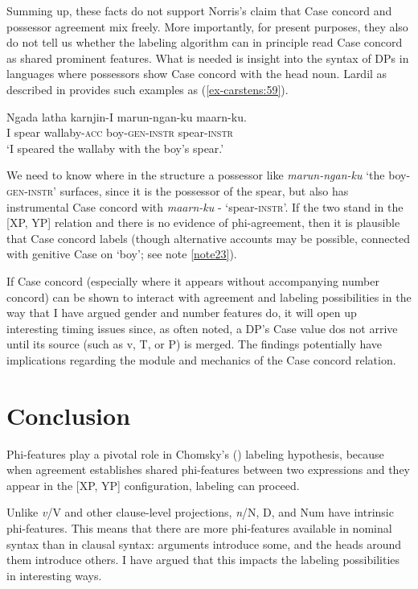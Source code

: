 \documentclass[output=paper
,modfonts
,nonflat]{langsci/langscibook}
\begin{document}
Summing up, these facts do not support Norris’s claim that Case concord and possessor agreement mix freely. More importantly, for present purposes, they also do not tell us whether the labeling algorithm can in principle {\textquotedbl}read{\textquotedbl} Case concord as shared prominent features. What is needed is insight into the syntax of DPs in languages where possessors show Case concord with the head noun. Lardil as described in \citet{Richards2007} provides such examples as (\ref{ex-carstens:59}).

\begin{exe}
\ex \label{ex-carstens:59}
\gll Ngada latha   karnjin-I       marun-ngan-ku   maarn-ku.\\
I    spear  wallaby-\textsc{acc} boy-\textsc{gen-instr}    spear-\textsc{instr}\\
\glt `I speared the wallaby with the boy's spear.'
\end{exe}
We need to know where in the structure a possessor like \textit{marun-ngan-ku} `the boy-\textsc{gen-instr}' surfaces, since it is the possessor of the spear, but also has instrumental Case concord with \textit{maarn-ku} - `spear-\textsc{instr}'. If the two stand in the [XP, YP] relation and there is no evidence of phi-agreement, then it is plausible that Case concord labels (though alternative accounts may be possible, connected with genitive Case on `boy'; see note \ref{note23}).

If Case concord (especially where it appears without accompanying number concord) can be shown to interact with agreement and labeling possibilities in the way that I have argued gender and number features do, it will open up interesting timing issues since, as often noted, a DP’s Case value dos not arrive until its source (such as v, T, or P) is merged. The findings potentially have implications regarding the module and mechanics of the Case concord relation.  

\section{Conclusion} \label{sec-carstens:8}

Phi-features play a pivotal role in Chomsky's (\citeyear{Chomsky2013, Chomsky2015}) labeling hypothesis, because when agreement establishes shared phi-features between two expressions and they appear in the [XP, YP] configuration, labeling can proceed. 

Unlike \textit{v}/V and other clause-level projections, \textit{n}/N, D, and Num have intrinsic phi-features. This means that there are more phi-features available in nominal syntax than in clausal syntax: arguments introduce some, and the heads around them introduce others. I have argued that this impacts the labeling possibilities in interesting ways.
\end{document}
